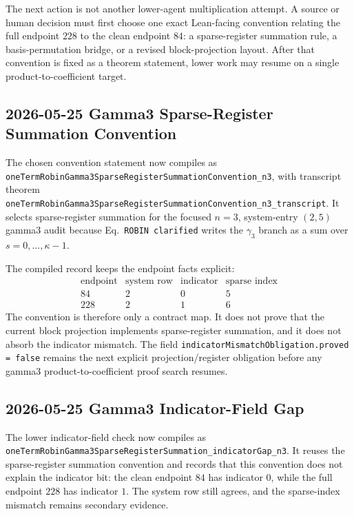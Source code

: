 The next action is not another lower-agent multiplication attempt.  A source
or human decision must first choose one exact Lean-facing convention relating
the full endpoint \(228\) to the clean endpoint \(84\): a sparse-register
summation rule, a basis-permutation bridge, or a revised block-projection
layout.  After that convention is fixed as a theorem statement, lower work may
resume on a single product-to-coefficient target.

\subsection{2026-05-25 Gamma3 Sparse-Register Summation Convention}

The chosen convention statement now compiles as
\texttt{oneTermRobinGamma3SparseRegisterSummationConvention\_n3}, with
transcript theorem
\texttt{oneTermRobinGamma3SparseRegisterSummationConvention\_n3\_transcript}.
It selects sparse-register summation for the focused \(n=3\), system-entry
\((2,5)\) gamma3 audit because Eq.~\texttt{ROBIN clarified} writes the
\(\gamma_3\) branch as a sum over \(s=0,\dots,\kappa-1\).

The compiled record keeps the endpoint facts explicit:
\[
\begin{array}{c|ccc}
\text{endpoint} & \text{system row} & \text{indicator} & \text{sparse index} \\
\hline
84 & 2 & 0 & 5 \\
228 & 2 & 1 & 6
\end{array}
\]
The convention is therefore only a contract map.  It does not prove that the
current block projection implements sparse-register summation, and it does not
absorb the indicator mismatch.  The field
\texttt{indicatorMismatchObligation.proved = false} remains the next explicit
projection/register obligation before any gamma3 product-to-coefficient proof
search resumes.

\subsection{2026-05-25 Gamma3 Indicator-Field Gap}

The lower indicator-field check now compiles as
\texttt{oneTermRobinGamma3SparseRegisterSummation\_indicatorGap\_n3}.  It
reuses the sparse-register summation convention and records that this
convention does not explain the indicator bit: the clean endpoint \(84\) has
indicator \(0\), while the full endpoint \(228\) has indicator \(1\).  The
system row still agrees, and the sparse-index mismatch remains secondary
evidence.

